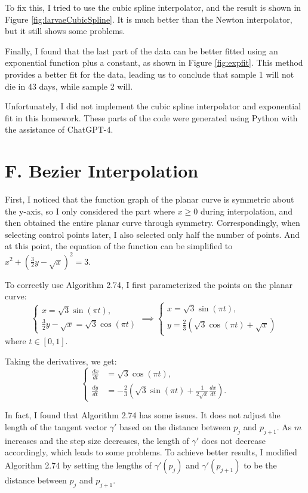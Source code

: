 \documentclass[a4paper]{article}
\begin{document}
To fix this, I tried to use the cubic spline interpolator, and the result is shown in Figure \ref{fig:larvaeCubicSpline}. It is much better than the Newton interpolator, but it still shows some problems.

Finally, I found that the last part of the data can be better fitted using an exponential function plus a constant, as shown in Figure \ref{fig:expfit}. This method provides a better fit for the data, leading us to conclude that sample 1 will not die in 43 days, while sample 2 will.

Unfortunately, I did not implement the cubic spline interpolator and exponential fit in this homework. These parts of the code were generated using Python with the assistance of ChatGPT-4.
\section{F. Bezier Interpolation}
First, I noticed that the function graph of the planar curve is symmetric about the y-axis, so I only considered the part where \( x \geq 0 \) during interpolation, and then obtained the entire planar curve through symmetry. Correspondingly, when selecting control points later, I also selected only half the number of points. And at this point, the equation of the function can be simplified to \( x^2 + \left(\frac{3}{2}y - \sqrt{x}\right)^2 = 3 \).

To correctly use Algorithm 2.74, I first parameterized the points on the planar curve:
\[
\begin{cases}
  x = \sqrt{3} \sin(\pi t), \\
  \frac{3}{2}y - \sqrt{x} = \sqrt{3} \cos(\pi t)
\end{cases}
\implies
\begin{cases}
  x = \sqrt{3} \sin(\pi t), \\
  y = \frac{2}{3} \left( \sqrt{3} \cos(\pi t) + \sqrt{x} \right)
\end{cases}
\]
where \( t \in [0, 1] \).

Taking the derivatives, we get:
\[
\begin{cases}
  \frac{dx}{dt} &= \sqrt{3} \cos(\pi t), \\
  \frac{dy}{dt} &= -\frac{2}{3} \left( \sqrt{3} \sin(\pi t) + \frac{1}{2\sqrt{x}} \frac{dx}{dt} \right).
\end{cases}
\]

In fact, I found that Algorithm 2.74 has some issues. It does not adjust the length of the tangent vector \(\gamma'\) based on the distance between \(p_j\) and \(p_{j+1}\). As \(m\) increases and the step size decreases, the length of \(\gamma'\) does not decrease accordingly, which leads to some problems. To achieve better results, I modified Algorithm 2.74 by setting the lengths of \(\gamma'(p_j)\) and \(\gamma'(p_{j+1})\) to be the distance between \(p_j\) and \(p_{j+1}\).
\end{document}
